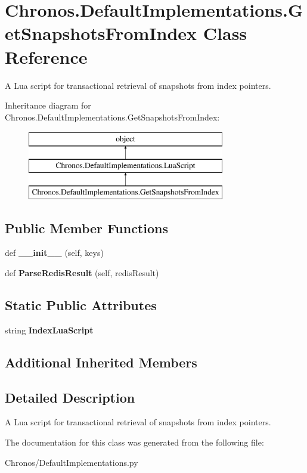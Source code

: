 \hypertarget{classChronos_1_1DefaultImplementations_1_1GetSnapshotsFromIndex}{}\section{Chronos.\+Default\+Implementations.\+Get\+Snapshots\+From\+Index Class Reference}
\label{classChronos_1_1DefaultImplementations_1_1GetSnapshotsFromIndex}


A Lua script for transactional retrieval of snapshots from index pointers.  


Inheritance diagram for Chronos.\+Default\+Implementations.\+Get\+Snapshots\+From\+Index\+:\begin{figure}[H]
\begin{center}
\leavevmode
\includegraphics[height=3.000000cm]{classChronos_1_1DefaultImplementations_1_1GetSnapshotsFromIndex}
\end{center}
\end{figure}
\subsection*{Public Member Functions}
\begin{DoxyCompactItemize}
\item 
def {\bfseries \+\_\+\+\_\+init\+\_\+\+\_\+} (self, keys)
\item 
def {\bfseries Parse\+Redis\+Result} (self, redis\+Result)
\end{DoxyCompactItemize}
\subsection*{Static Public Attributes}
\begin{DoxyCompactItemize}
\item 
string {\bfseries Index\+Lua\+Script}
\end{DoxyCompactItemize}
\subsection*{Additional Inherited Members}


\subsection{Detailed Description}
A Lua script for transactional retrieval of snapshots from index pointers. 



The documentation for this class was generated from the following file\+:\begin{DoxyCompactItemize}
\item 
Chronos/Default\+Implementations.\+py\end{DoxyCompactItemize}
